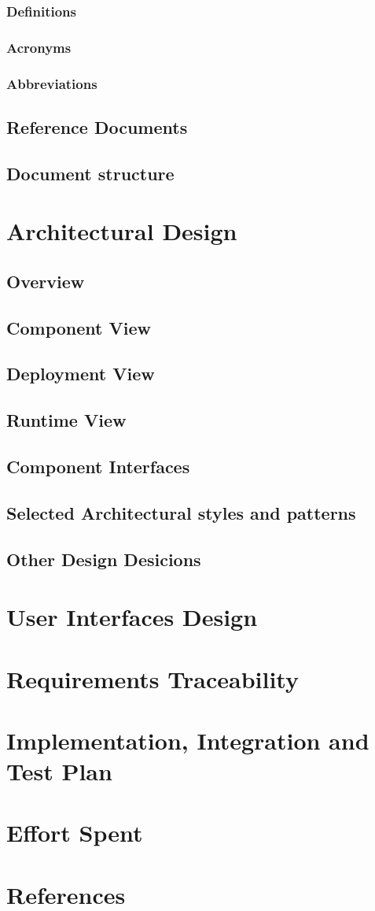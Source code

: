 \documentclass{article}
\begin{document}
\subsubsection{Definitions}
\subsubsection{Acronyms}
\subsubsection{Abbreviations}
\subsection{Reference Documents}
\subsection{Document structure}
\newpage
\section{Architectural Design}
\subsection{Overview}
\subsection{Component View}
\subsection{Deployment View}
\subsection{Runtime View}
\subsection{Component Interfaces}
\subsection{Selected Architectural styles and patterns}
\subsection{Other Design Desicions}
\newpage
\section{User Interfaces Design}
\newpage
\section{Requirements Traceability}
\newpage
\section{Implementation, Integration and Test Plan}
\newpage
\section{Effort Spent}
\newpage
\section{References}
\end{document}
